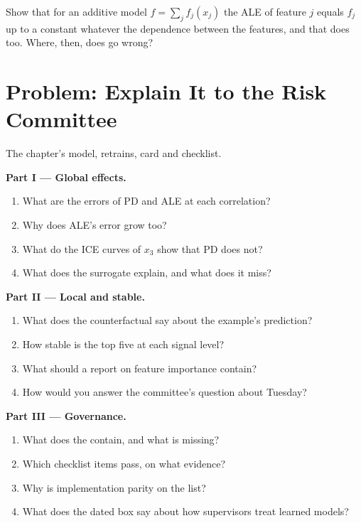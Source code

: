 \begin{exercise}[$\star\star\star$]\label{exo:ml:interpretability-and-model-governance:8}
Show that for an additive model $f = \sum_jf_j(x_j)$ the ALE of feature $j$ equals $f_j$ up to a constant whatever the
dependence between the features, and that  does too. Where, then, does  go wrong?
\end{exercise}

\section{Problem: Explain It to the Risk Committee}

\begin{problem}\label{pb:ml:interpretability-and-model-governance:1}
The chapter's model, retrains, card and checklist.

\medskip\noindent\textbf{Part I --- Global effects.}
\begin{enumerate}
\item What are the errors of PD and ALE at each correlation?
\item Why does ALE's error grow too?
\item What do the ICE curves of $x_3$ show that PD does not?
\item What does the surrogate explain, and what does it miss?
\end{enumerate}

\medskip\noindent\textbf{Part II --- Local and stable.}
\begin{enumerate}[resume]
\item What does the counterfactual say about the example's prediction?
\item How stable is the top five at each signal level?
\item What should a report on feature importance contain?
\item How would you answer the committee's question about Tuesday?
\end{enumerate}

\medskip\noindent\textbf{Part III --- Governance.}
\begin{enumerate}[resume]
\item What does the  contain, and what is missing?
\item Which checklist items pass, on what evidence?
\item Why is implementation parity on the list?
\item What does the dated box say about how supervisors treat learned models?
\end{enumerate}


\end{problem}
